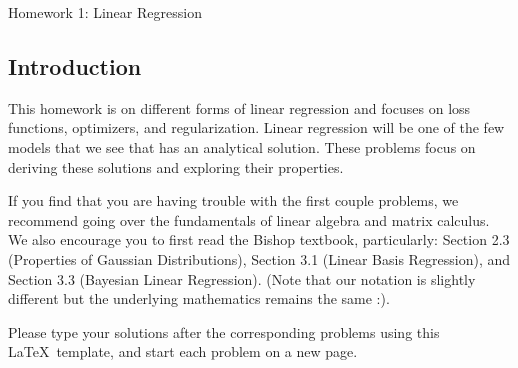 \documentclass[submit]{harvardml}
\begin{document}
\begin{center}
{\Large Homework 1: Linear Regression}\\
\end{center}



\subsection*{Introduction}
This homework is on different forms of linear regression and focuses
on loss functions, optimizers, and regularization. Linear regression 
will be one of the few models that we see that has an analytical solution.
These problems focus on deriving these solutions and exploring their 
properties. 

If you find that you are having trouble with the first couple
problems, we recommend going over the fundamentals of linear algebra
and matrix calculus. We also encourage you to first read the Bishop
textbook, particularly: Section 2.3 (Properties of Gaussian
Distributions), Section 3.1 (Linear Basis Regression), and Section 3.3
(Bayesian Linear Regression). (Note that our notation is slightly different but
the underlying mathematics remains the same :).

Please type your solutions after the corresponding problems using this \LaTeX\ template, and start each problem on a new page.\\

\pagebreak 
\end{document}
